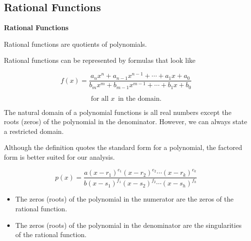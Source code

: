 \documentclass{ximera}
\begin{document}
\subsection*{Rational Functions}




\begin{template}  \textbf{\textcolor{blue!55!black}{Rational Functions}} 



Rational functions are quotients of polynomials. 


Rational functions can be represented by formulas that look like


\[ 
f(x) = \frac{ a_n x^n + a_{n-1} x^{n-1} + \cdots + a_1 x + a_0 } {b_m x^m + b_{m-1} x^{m-1} + \cdots + b_1 x + b_0}
\]


\[  \text{ for all } x  \, \text{ in the domain. }   \]



\end{template}




The natural domain of a polynomial functions is all real numbers except the roots (zeros) of the polynomial in the denominator.  However, we can always state a restricted domain.








Although the definition quotes the standard form for a polynomial, the factored form is better suited for our analysis.

\[
p(x) = \frac{ a (x - r_1)^{e_1} (x - r_2)^{e_2} \cdots  (x - r_k)^{e_k} } { b (x - s_1)^{f_1} (x - s_2)^{f_2} \cdots  (x - s_h)^{f_h} }
\]








\begin{itemize}
\item The zeros (roots) of the polynomial in the numerator are the zeros of the rational function.
\item The zeros (roots) of the polynomial in the denominator are the singularities of the rational function.
\end{itemize}
\end{document}
